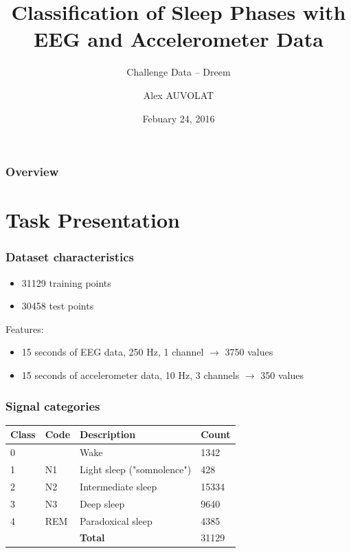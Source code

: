 \documentclass{beamer}
\title{Classification of Sleep Phases with EEG and Accelerometer Data}
\subtitle{Challenge Data -- Dreem}
\author{Alex AUVOLAT}
\date{Febuary 24, 2016}
\begin{document}
\begin{frame}
\titlepage
\end{frame}

\begin{frame}
\frametitle{Overview}
\tableofcontents
\end{frame}

\section{Task Presentation}
\frame{\sectionpage}

\begin{frame}
	\frametitle{Dataset characteristics}
	\begin{itemize}
		\item 31129 training points
		\item 30458 test points
	\end{itemize}
	Features:
	\begin{itemize}
		\item 15 seconds of EEG data, 250 Hz, 1 channel $\to$ 3750 values
		\item 15 seconds of accelerometer data, 10 Hz, 3 channels $\to$ 350 values
	\end{itemize}
\end{frame}

\begin{frame}
	\frametitle{Signal categories}
	\begin{table}\centering
	\begin{tabular}{l l l l}
		\textbf{Class}&\textbf{Code}&\textbf{Description}&\textbf{Count}\\ \hline
		0 & & Wake & 1342\\
		1 & N1 & Light sleep ("somnolence") & 428 \\
		2 & N2 & Intermediate sleep & 15334 \\
		3 & N3 & Deep sleep & 9640 \\
		4 & REM & Paradoxical sleep & 4385 \\ \hline
		& & \textbf{Total} & 31129 \\
	\end{tabular}
	\end{table}
\end{frame}
\end{document}
